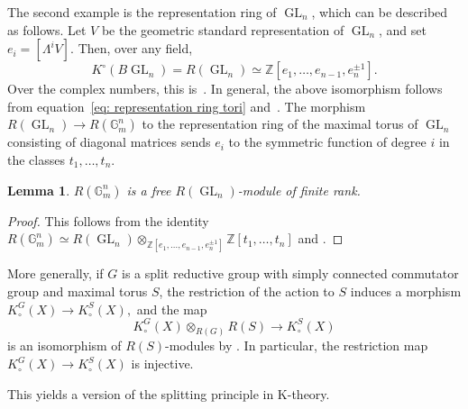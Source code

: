\documentclass[12pt]{amsart}
\newcommand\Gm{\mathbb{G}_m}
\newcommand\Z{\mathbb{Z}}
\newcommand{\GL}{\operatorname{GL}}
\newcommand{\Kring}{K^{\circ}}
\newcommand{\Kgroup}{K_{\circ}}
\newtheorem{Lemma}[theorem]{Lemma}
\theoremstyle{definition}
\begin{document}
The second example is the representation ring of $\GL_n$, which can be described as follows. Let $V$ be the geometric standard representation of $\GL_n$, and set $e_i=[\Lambda^iV]$. Then, over any field,
\begin{equation}\label{eq: representation ring GLn}
    \Kring(B\GL_n)=R(\GL_n)\simeq\Z[e_1,\ldots,e_{n-1},e_n^{\pm 1}].
\end{equation}
Over the complex numbers, this is~\cite[Exercise 23.36 (d)]{FultonHarris-RepresentationTheory}. In general, the above isomorphism follows from equation~\eqref{eq: representation ring tori} and~\cite[Theorem 22.38]{Milne_algebraicgroups}. The morphism $R(\GL_n)\rightarrow R(\Gm^n)$ to the representation ring of the maximal torus of $\GL_n$ consisting of diagonal matrices sends $e_i$ to the symmetric function of degree $i$ in the classes $t_1,\ldots,t_n$.

\begin{Lemma}\label{lemma: basis R(GL)}
    $R(\Gm^n)$ is a free $R(\GL_n)$-module of finite rank.
\end{Lemma}
\begin{proof}
    This follows from the identity $R(\Gm^n)\simeq R(\GL_n) \otimes_{\Z[e_1,\ldots,e_{n-1},e_n^{\pm1}]}\Z[t_1,\dots,t_n]$ and \cite[Lemma 3.1]{CLI}.
\end{proof}

More generally, if $G$ is a split reductive group with simply connected commutator group and maximal torus $S$, the restriction of the action to $S$ induces a morphism
$
\Kgroup^{G}(X) \to \Kgroup^{S}(X),
$
and the map
\begin{equation}\label{eqn: iso from Gln to T}
\Kgroup^{G}(X) \otimes_{R(G)} R(S) \longrightarrow \Kgroup^{S}(X)
\end{equation}
is an isomorphism of $R(S)$-modules by \cite[Proposition~31]{Merkurjev-equivariantKtheory}. In particular, the restriction map $
\Kgroup^{G}(X) \to \Kgroup^{S}(X)$ is injective.

This yields a version of the splitting principle in K-theory.
\end{document}

